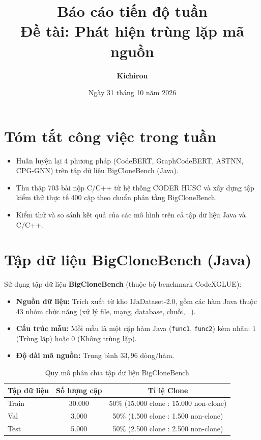 \documentclass[11pt,a4paper]{article}
\title{\vspace{-1.5cm}\textbf{Báo cáo tiến độ tuần}\\[4pt]
       {\normalsize Đề tài: Phát hiện trùng lặp mã nguồn}}
\author{\textbf{Kichirou}}
\date{Ngày 31 tháng 10 năm 2026}
\begin{document}
\maketitle
\vspace{-1.0cm}

\section{Tóm tắt công việc trong tuần}
\begin{itemize}
\item Huấn luyện lại 4 phương pháp (CodeBERT, GraphCodeBERT, ASTNN, CPG-GNN) trên tập dữ liệu BigCloneBench (Java).
\item Thu thập 703 bài nộp C/C++ từ hệ thống CODER HUSC và xây dựng tập kiểm thử thực tế 400 cặp theo chuẩn phân tầng BigCloneBench.
\item Kiểm thử và so sánh kết quả của các mô hình trên cả tập dữ liệu Java và C/C++.
\end{itemize}

\section{Tập dữ liệu BigCloneBench (Java)}
Sử dụng tập dữ liệu \textbf{BigCloneBench} (thuộc bộ benchmark CodeXGLUE):
\begin{itemize}
\item \textbf{Nguồn dữ liệu:} Trích xuất từ kho IJaDataset-2.0, gồm các hàm Java thuộc 43 nhóm chức năng (xử lý file, mạng, database, chuỗi,...).
\item \textbf{Cấu trúc mẫu:} Mỗi mẫu là một cặp hàm Java (\texttt{func1}, \texttt{func2}) kèm nhãn: $1$ (Trùng lặp) hoặc $0$ (Không trùng lặp).
\item \textbf{Độ dài mã nguồn:} Trung bình $33,96$ dòng/hàm.
\end{itemize}

\begin{table}[H]
\centering
\caption{Quy mô phân chia tập dữ liệu BigCloneBench}
\label{tab:bcb_dataset_split}
\begin{tabular}{lcc}
\toprule
\textbf{Tập dữ liệu} & \textbf{Số lượng cặp} & \textbf{Tỉ lệ Clone} \\
\midrule
Train & 30.000 & 50\% (15.000 clone : 15.000 non-clone) \\
Val   & 3.000  & 50\% (1.500 clone : 1.500 non-clone) \\
Test  & 5.000  & 50\% (2.500 clone : 2.500 non-clone) \\
\bottomrule
\end{tabular}
\end{table}
\end{document}
